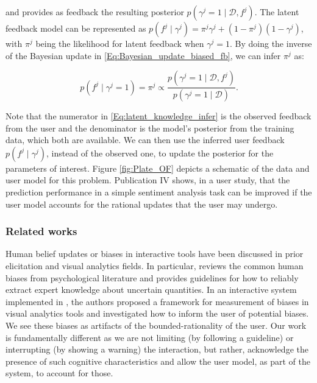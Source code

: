 \documentclass[dissertation,math,vertlayout,pdfa,colorlinks]{aaltoseries}
\newcommand{\bD}{\mathcal{D}}
\begin{document}
\noindent and provides as feedback the resulting posterior  $p(\gamma^j=1 \mid \bD, f^{j})$. The latent feedback model can be represented as $p(f^{j}\mid \gamma^j) = \pi^j \gamma^j + (1-\pi^j) (1-\gamma^j)$, with $\pi^j$ being the likelihood for latent feedback when $\gamma^j=1$. By doing the inverse of the Bayesian update in \ref{Eq:Bayesian_update_biased_fb}, we can infer $\pi^j$ as:

\begin{equation}\label{Eq:latent_knowledge_infer}
p(f^{j}\mid \gamma^j=1)=\pi^j \propto \dfrac{p(\gamma^j=1 \mid \bD, f^{j})}{p(\gamma^j =1\mid \bD)}.
\end{equation}  

Note that the numerator in \ref{Eq:latent_knowledge_infer} is the observed feedback from the user and the denominator is the model's posterior from the training data, which both are available. We can then use the inferred user feedback $p(f^{j}\mid \gamma^j)$, instead of the observed one, to update the posterior for the parameters of interest. Figure \ref{fig:Plate_OF} depicts a schematic of the data and user model for this problem. Publication IV shows, in a user study, that the prediction performance in a simple sentiment analysis task can be improved if the user model accounts for the rational updates that the user may undergo.

\subsubsection{Related works}

Human belief updates or biases in interactive tools have been discussed in prior elicitation \cite{garthwaite2005statistical} and visual analytics \cite{bias_warning} fields. In particular, \cite{garthwaite2005statistical} reviews the common human biases from psychological literature and provides guidelines for how to reliably extract expert knowledge about uncertain quantities. In an interactive system implemented in \cite{bias_warning}, the authors proposed a framework for measurement of biases in visual analytics tools and investigated how to inform the user of potential biases. We see these biases as artifacts of the bounded-rationality of the user. Our work is fundamentally different as we are not limiting (by following a guideline) or interrupting (by showing a warning) the interaction, but rather, acknowledge the presence of such cognitive characteristics and allow the user model, as part of the system, to account for those. 
\end{document}
